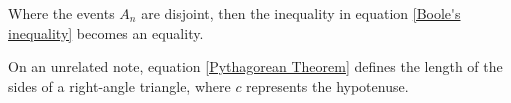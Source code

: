 \label{ch_task}


Where the events $A_n$ are disjoint, then the inequality
in equation \ref{Boole's inequality} becomes an equality.


On an unrelated note, equation \ref{Pythagorean Theorem} defines the length of
the sides of a right-angle triangle, where $c$ represents the hypotenuse.
